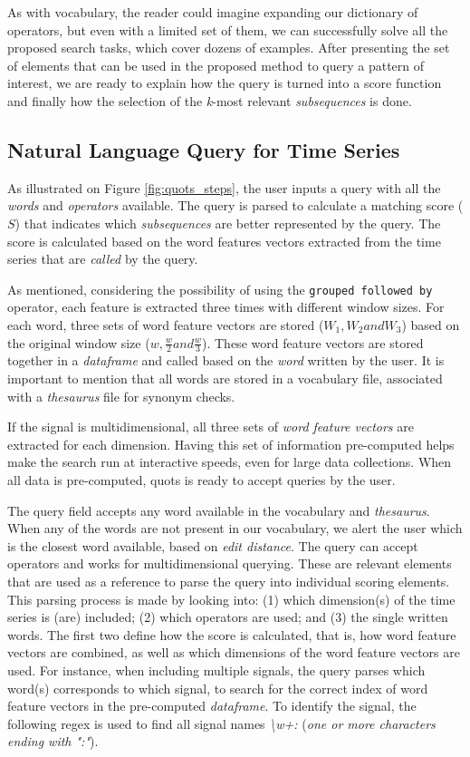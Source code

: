 As with vocabulary, the reader could imagine expanding our dictionary of operators, but even with a limited set of them, we can successfully solve all the proposed search tasks, which cover dozens of examples. After presenting the set of elements that can be used in the proposed method to query a pattern of interest, we are ready to explain how the query is turned into a score function and finally how the selection of the \textit{k}-most relevant \textit{subsequences} is done. 

\subsection{Natural Language Query for Time Series}

As illustrated on Figure \ref{fig:quots_steps}, the user inputs a query with all the \textit{words} and \textit{operators} available. The query is parsed to calculate a matching score ($S$) that indicates which \textit{subsequences} are better represented by the query. The score is calculated based on the word features vectors extracted from the time series that are \textit{called} by the query.
\par
As mentioned, considering the possibility of using the \texttt{grouped followed by} operator, each feature is extracted three times with different window sizes. For each word, three sets of word feature vectors are stored ($W_1, W_2 and W_3$) based on the original window size ($w, \frac{w}{2} and \frac{w}{3}$). These word feature vectors are stored together in a \textit{dataframe} and called based on the \textit{word} written by the user. It is important to mention that all words are stored in a vocabulary file, associated with a \textit{thesaurus} file for synonym checks.
\par
If the signal is multidimensional, all three sets of \textit{word feature vectors} are extracted for each dimension. Having this set of information pre-computed helps make the search run at interactive speeds, even for large data collections. When all data is pre-computed, \gls{quots} is ready to accept queries by the user. 
\par
The query field accepts any word available in the vocabulary and \textit{thesaurus}. When any of the words are not present in our vocabulary, we alert the user which is the closest word available, based on \textit{edit distance}. The query can accept operators and works for multidimensional querying. These are relevant elements that are used as a reference to parse the query into individual scoring elements. This parsing process is made by looking into: (1) which dimension(s) of the time series is (are) included; (2) which operators are used; and (3) the single written words. The first two define how the score is calculated, that is, how word feature vectors are combined, as well as which dimensions of the word feature vectors are used. For instance, when including multiple signals, the query parses which word(s) corresponds to which signal, to search for the correct index of word feature vectors in the pre-computed \textit{dataframe}. To identify the signal, the following \gls{regex} is used to find all signal names \textit{\textbackslash w+:} (\textit{one or more characters ending with ":"}).

